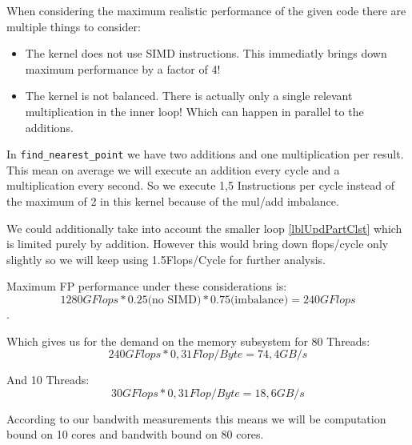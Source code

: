 When considering the maximum realistic performance of the given code there are multiple things to consider:

\begin{itemize}
	\item The kernel does not use SIMD instructions. This immediatly brings down maximum performance by a factor of 4!
	\item The kernel is not balanced. There is actually only a single relevant multiplication in the inner loop! Which can happen in parallel to the additions.
\end{itemize}

In \texttt{find\_nearest\_point} we have two additions and one multiplication per result. This mean on average we will execute an addition every cycle and a multiplication every second.
So we execute 1,5 Instructions per cycle instead of the maximum of 2 in this kernel because of the mul/add imbalance.

We could additionally take into account the smaller loop \autoref{lblUpdPartClst} which is limited purely by addition.
However this would bring down flops/cycle only slightly so we will keep using 1.5Flops/Cycle for further analysis.

Maximum FP performance under these considerations is:
$$1280 GFlops * 0.25 \text{(no SIMD)}  * 0.75 \text{(imbalance)} = 240 GFlops$$.

Which gives us for the demand on the memory subsystem for 80 Threads:
$${240 GFlops}*{0,31 Flop/Byte} = 74,4 GB/s$$

And 10 Threads:
$${30 GFlops}*{0,31 Flop/Byte} = 18,6 GB/s$$

According to our bandwith measurements this means we will be computation bound on 10 cores and bandwith bound on 80 cores.





